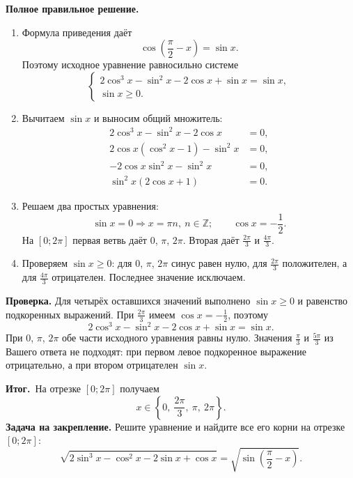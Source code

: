 \documentclass[a4paper,11pt]{article}
\newcommand{\result}{\textcolor{success}{\textbf{Итог.}}\ }
\begin{document}
\textbf{Полное правильное решение.}
\begin{enumerate}
\item Формула приведения даёт
\[
\cos\left(\frac\pi2-x\right)=\sin x.
\]
Поэтому исходное уравнение равносильно системе
\[
\begin{cases}
2\cos^3x-\sin^2x-2\cos x+\sin x=\sin x,\\
\sin x\ge0.
\end{cases}
\]
\item Вычитаем $\sin x$ и выносим общий множитель:
\begin{align*}
2\cos^3x-\sin^2x-2\cos x&=0,\\
2\cos x(\cos^2x-1)-\sin^2x&=0,\\
-2\cos x\sin^2x-\sin^2x&=0,\\
\sin^2x(2\cos x+1)&=0.
\end{align*}
\item Решаем два простых уравнения:
\[
\sin x=0\Rightarrow x=\pi n,\ n\in\mathbb Z;
\qquad \cos x=-\frac12.
\]
На $[0;2\pi]$ первая ветвь даёт $0$, $\pi$, $2\pi$. Вторая даёт $\frac{2\pi}3$ и $\frac{4\pi}3$.
\item Проверяем $\sin x\ge0$: для $0$, $\pi$, $2\pi$ синус равен нулю, для $\frac{2\pi}3$ положителен, а для $\frac{4\pi}3$ отрицателен. Последнее значение исключаем.
\end{enumerate}
\textbf{Проверка.} Для четырёх оставшихся значений выполнено $\sin x\ge0$ и равенство подкоренных выражений. При $\frac{2\pi}3$ имеем $\cos x=-\frac12$, поэтому
\[
2\cos^3x-\sin^2x-2\cos x+\sin x=\sin x.
\]
При $0$, $\pi$, $2\pi$ обе части исходного уравнения равны нулю. Значения $\frac\pi3$ и $\frac{5\pi}3$ из Вашего ответа не подходят: при первом левое подкоренное выражение отрицательно, а при втором отрицателен $\sin x$.

\result На отрезке $[0;2\pi]$ получаем
\[
\boxed{x\in\left\{0,\ \frac{2\pi}{3},\ \pi,\ 2\pi\right\}}.
\]
\textbf{Задача на закрепление.} Решите уравнение и найдите все его корни на отрезке $[0;2\pi]$:
\[
\sqrt{2\sin^3x-\cos^2x-2\sin x+\cos x}
=\sqrt{\sin\left(\frac\pi2-x\right)}.
\]
\end{document}
